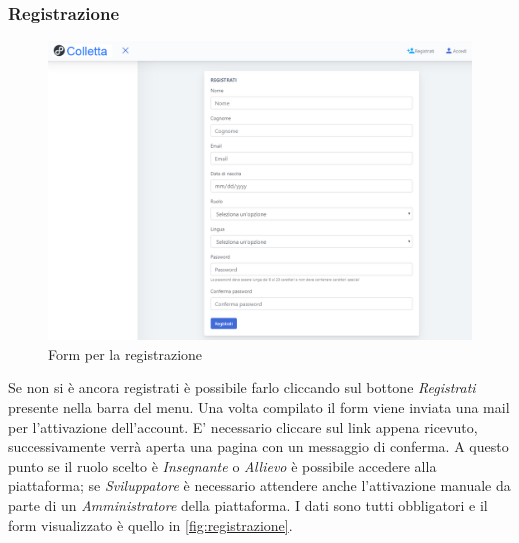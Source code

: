     \subsubsection{Registrazione}
    	\begin{figure}[H]
        	\centering
        	\includegraphics[width=1\linewidth]{sez/img/autenticazione/formRegistrazione.PNG} 
        	\caption{Form per la registrazione}\label{fig:registrazione}
    	\end{figure}
	   Se non si è ancora registrati è possibile farlo cliccando sul bottone \textit{Registrati} presente nella barra del menu. Una volta compilato il {form} viene inviata una mail per l'attivazione dell'account. E' necessario cliccare sul link appena ricevuto, successivamente verrà aperta una pagina con un messaggio di conferma. A questo punto se il ruolo scelto è \textit{Insegnante} o \textit{Allievo} è possibile accedere alla piattaforma; se \textit{Sviluppatore} è necessario attendere anche l'attivazione manuale da parte di un  \textit{Amministratore} della piattaforma. I dati sono tutti obbligatori e il form visualizzato è quello in \autoref{fig:registrazione}.
